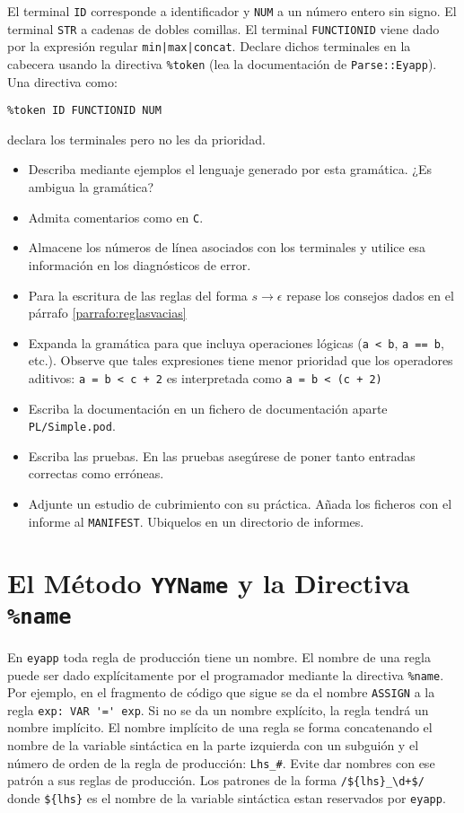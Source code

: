 El terminal \verb|ID| corresponde a identificador y \verb|NUM| a un número entero sin signo. 
El terminal \verb|STR| a cadenas de dobles comillas.
El terminal \verb|FUNCTIONID| viene dado por la expresión regular \verb#min|max|concat#.
Declare dichos terminales en la cabecera usando la directiva \verb|%token| (lea la documentación de 
\verb|Parse::Eyapp|). Una directiva como:
\begin{verbatim}
%token ID FUNCTIONID NUM
\end{verbatim}
declara los terminales pero no les da prioridad.

\begin{itemize}
\item
Describa mediante ejemplos el lenguaje generado por esta gramática.
¿Es ambigua la gramática?
\item
Admita comentarios como en \verb|C|.
\item
Almacene los números de línea asociados con los terminales y utilice esa información
en los diagnósticos de error.
\item
Para la escritura de las reglas del forma $s \rightarrow \epsilon$
repase los consejos dados en el párrafo \ref{parrafo:reglasvacias}

\item
Expanda la gramática para que incluya operaciones lógicas (\verb|a < b|, \verb|a == b|, etc.).
Observe que tales expresiones tiene menor prioridad que los operadores aditivos:
\verb|a = b < c + 2| es interpretada como \verb|a = b < (c + 2)| 
\item
Escriba la documentación en un fichero de documentación aparte \verb|PL/Simple.pod|.
\item
Escriba las pruebas.
En las pruebas asegúrese de poner tanto entradas correctas como erróneas.
\item
Adjunte un estudio de cubrimiento con su práctica. 
Añada los ficheros con el informe al \verb|MANIFEST|. Ubiquelos en un directorio
de informes.
\end{itemize}

\section{El Método {\tt YYName} y la Directiva {\tt \%name}}


En \verb|eyapp| toda regla de producción tiene un nombre.
El nombre de una regla puede ser dado explícitamente por el programador
mediante la directiva \verb|%name|.
Por ejemplo, en el fragmento de código que sigue se da el nombre
\verb|ASSIGN| a la regla \verb|exp: VAR '=' exp|.
Si no se da un nombre explícito, la regla tendrá un nombre implícito.
El nombre implícito de una regla se forma concatenando el nombre de la
variable sintáctica en la parte izquierda con un subguión y el número de orden de la
regla de producción: \verb|Lhs_#|. Evite dar nombres con ese patrón 
a sus reglas de producción. Los patrones de la forma 
\verb|/${lhs}_\d+$/| donde \verb|${lhs}| es el nombre de la variable sintáctica
estan reservados por \verb|eyapp|.

